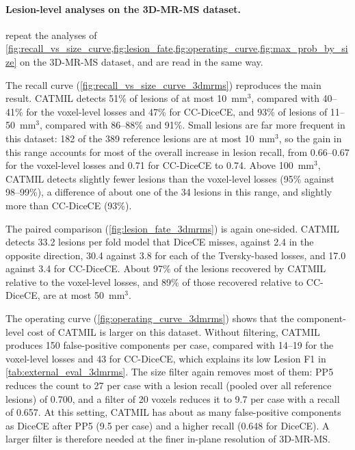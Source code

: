 \paragraph{Lesion-level analyses on the 3D-MR-MS dataset.}
repeat the analyses of
\cref{fig:recall_vs_size_curve,fig:lesion_fate,fig:operating_curve,fig:max_prob_by_size}
on the 3D-MR-MS dataset, and are read in the same way.

The recall curve (\cref{fig:recall_vs_size_curve_3dmrms}) reproduces the
main result. CATMIL detects 51\% of lesions of at most 10~mm$^3$, compared
with 40--41\% for the voxel-level losses and 47\% for CC-DiceCE, and 93\%
of lesions of 11--50~mm$^3$, compared with 86--88\% and 91\%. Small lesions
are far more frequent in this dataset: 182 of the 389 reference lesions are
at most 10~mm$^3$, so the gain in this range accounts for most of the
overall increase in lesion recall, from 0.66--0.67 for the voxel-level
losses and 0.71 for CC-DiceCE to 0.74. Above 100~mm$^3$, CATMIL detects
slightly fewer lesions than the voxel-level losses (95\% against 98--99\%),
a difference of about one of the 34 lesions in this range, and slightly
more than CC-DiceCE (93\%).

The paired comparison (\cref{fig:lesion_fate_3dmrms}) is again one-sided.
CATMIL detects 33.2 lesions per fold model that DiceCE misses, against 2.4
in the opposite direction, 30.4 against 3.8 for each of the Tversky-based
losses, and 17.0 against 3.4 for CC-DiceCE. About 97\% of the lesions
recovered by CATMIL relative to the voxel-level losses, and 89\% of those
recovered relative to CC-DiceCE, are at most 50~mm$^3$.

The operating curve (\cref{fig:operating_curve_3dmrms}) shows that the
component-level cost of CATMIL is larger on this dataset. Without
filtering, CATMIL produces 150 false-positive components per case, compared
with 14--19 for the voxel-level losses and 43 for CC-DiceCE, which explains its low Lesion F1 in
\cref{tab:external_eval_3dmrms}. The size filter again removes most of
them: PP5 reduces the count to 27 per case with a lesion recall (pooled over all reference lesions) of 0.700, and a
filter of 20 voxels reduces it to 9.7 per case with a recall of 0.657. At
this setting, CATMIL has about as many false-positive components as DiceCE
after PP5 (9.5 per case) and a higher recall (0.648 for DiceCE). A larger filter
is therefore needed at the finer in-plane resolution of 3D-MR-MS.

